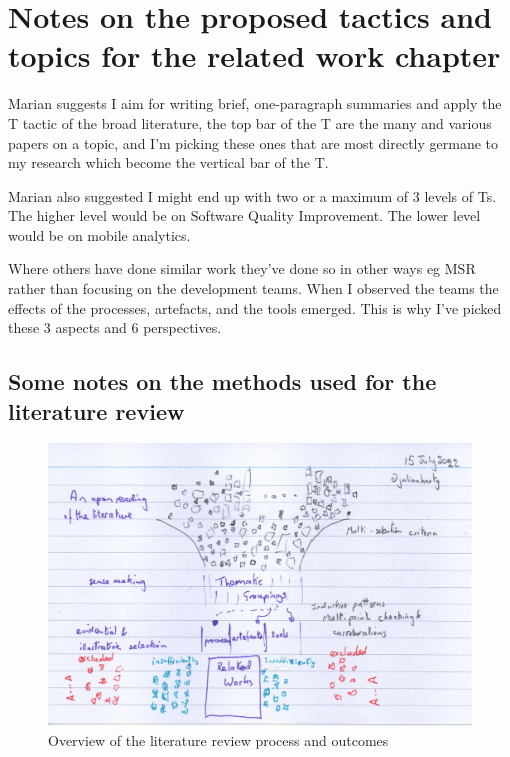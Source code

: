 \section*{Notes on the proposed tactics and topics for the related work chapter}
Marian suggests I aim for writing brief, one-paragraph summaries and apply the T tactic of the broad literature, the top bar of the T are the many and various papers on a topic, and I'm picking these ones that are most directly germane to my research which become the vertical bar of the T. 

Marian also suggested I might end up with two or a maximum of 3 levels of Ts. The higher level would be on Software Quality Improvement. The lower level would be on mobile analytics.

Where others have done similar work they've done so in other ways eg MSR rather than focusing on the development teams. When I observed the teams the effects of the processes, artefacts, and the tools emerged. This is why I've picked these 3 aspects and 6 perspectives. 

\subsection*{Some notes on the methods used for the literature review}

\begin{figure}
    \centering
    \includegraphics[width=\textwidth]{images/rough-sketches/literature-review-overview.jpeg}
    \caption{Overview of the literature review process and outcomes}
    \label{fig:literature-review-overview}
\end{figure}

